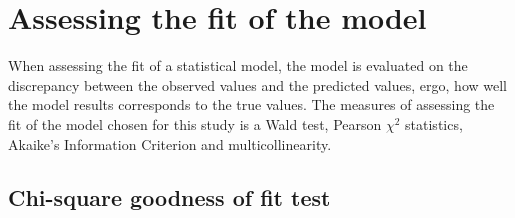 \section{Assessing the fit of the model}
When assessing the fit of a statistical model, the model is evaluated on the discrepancy between the observed values and the predicted values, ergo, how well the model results corresponds to 
the true values. The measures of assessing the fit of the model chosen for this study is a Wald test, Pearson $\chi^{2}$ statistics, Akaike’s Information Criterion and multicollinearity.
\subsection{Chi-square goodness of fit test} 

